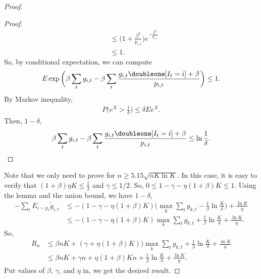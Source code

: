 \begin{proof}
\begin{proof}
\begin{align}
            &\le\Bigg(1+ \frac{\beta^2}{p_{i,t}}\Bigg)e^{-\frac{\beta^2}{p_{i,t}}} \\
            &\le 1.
        \end{align}
        So, by conditional expectation, we can compute
        \begin{align}
            E \exp\bigg(\beta\sum_t g_{i,t}-\beta\sum_t\frac{g_{i,t}\doubleone[I_t=i]+\beta}{p_{i,t}}\bigg)\le 1.
        \end{align}
        By Markov inequality,
        \begin{align}
            P\bigg(e^X>\frac{1}{\delta}\bigg) \le \delta E e^X.
        \end{align}
        Then, \wprob $1-\delta$,
        \begin{align}
            \beta\sum_t g_{i,t}-\beta\sum_t\frac{g_{i,t}\doubleone[I_t=i]+\beta}{p_{i,t}}\le\ln \frac{1}{\delta}.
        \end{align}
    \end{proof}
    Note that we only need to prove for $n\ge5.15\sqrt{nK\ln K}$.
    In this case, it is easy to verify that
    $(1+\beta)\eta K\le\frac{1}{2}$ and $\gamma\le 1/2$.
    So, $0\le 1-\gamma-\eta(1+\beta)K\le 1$.
    Using the lemma and the union bound,
    we have \wprob $1-\delta$,
    \begin{align}
        -\sum_t E_{i\sim p_t}\tilde g_{i, t}
            &\le -(1-\gamma-\eta(1+\beta)K)\bigg(\max_k\sum_t g_{k,t} -\frac{1}{\beta}\ln\frac{K}{\delta} \bigg)+ \frac{\ln K}{\eta} \\
            &\le -(1-\gamma-\eta(1+\beta)K)\max_k\sum_t g_{k,t} +\frac{1}{\beta}\ln\frac{K}{\delta}+ \frac{\ln K}{\eta}.
    \end{align}
    So,
    \begin{align}
        R_n
            &\le\beta nK + (\gamma+\eta(1+\beta)K))\max_k\sum_t g_{k,t}+\frac{1}{\beta}\ln\frac{K}{\delta}+ \frac{\ln K}{\eta} \\
            &\le \beta nK + \gamma n+\eta(1+\beta)Kn+\frac{1}{\beta}\ln\frac{K}{\delta}+ \frac{\ln K}{\eta}.
    \end{align}
    Put values of $\beta$, $\gamma$, and $\eta$ in,
    we get the desired result.
\end{proof}
